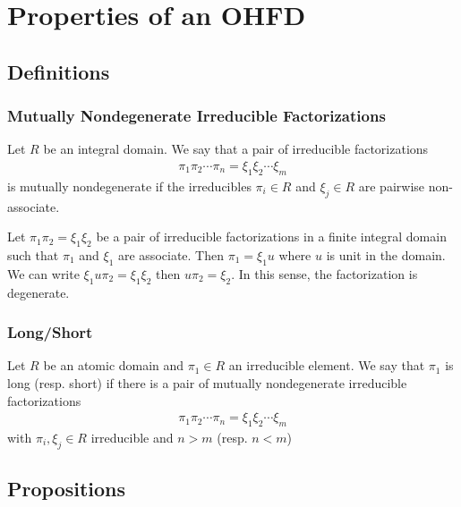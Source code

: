\section{Properties of an OHFD}

\subsection{Definitions}

\begin{frame}
  \frametitle{Mutually Nondegenerate Irreducible Factorizations}
  \begin{definition}
    Let $R$ be an integral domain. We say that a pair of irreducible factorizations
    \begin{align*}
      \pi_1\pi_2\cdots\pi_n = \xi_1\xi_2\cdots\xi_m
    \end{align*}
    is \alert{mutually nondegenerate} if the irreducibles $\pi_i \in R$ and $\xi_j \in R$ are pairwise non-associate.
  \end{definition}
  \begin{example}
    Let $\pi_1 \pi_2 = \xi_1 \xi_2$ be a pair of irreducible factorizations in a finite integral domain such that $\pi_1$ and $\xi_1$ are associate.
    Then $\pi_1 = \xi_1 u$ where $u$ is unit in the domain.
    We can write $\xi_1 u \pi_2 = \xi_1 \xi_2$ then $u \pi_2 = \xi_2$.
    In this sense, the factorization is degenerate.
  \end{example}
\end{frame}

\begin{frame}
  \frametitle{Long/Short}
  \begin{definition}
    Let $R$ be an atomic domain and $\pi_1 \in R$ an irreducible element.
    We say that $\pi_1$ is \alert{long} (resp. \alert{short}) if there is a pair of mutually nondegenerate irreducible factorizations
    \begin{align*}
      \pi_1\pi_2\cdots\pi_n = \xi_1\xi_2\cdots \xi_m
    \end{align*}
    with $\pi_i, \xi_j \in R$ irreducible and $n > m$ (resp. $n<m$)
  \end{definition}
\end{frame}

\subsection{Propositions}

